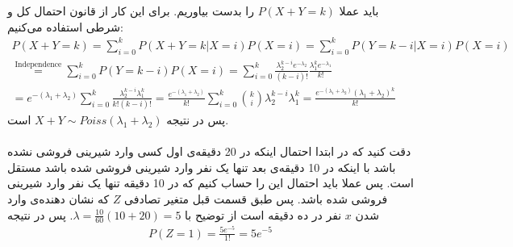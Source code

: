 \\
\\
باید عملا
$P(X + Y = k)$
را بدست بیاوریم. برای این کار از قانون احتمال کل و شرطی استفاده می‌کنیم:
\begin{gather*}
    P(X + Y = k) = \sum_{i=0}^k P(X + Y = k | X = i) P(X = i) = \sum_{i=0}^k P(Y = k - i | X = i) P(X = i)\\
    \stackrel{\text{Independence}}{=} \sum_{i=0}^k P(Y = k - i) P(X = i) = \sum_{i=0}^k \frac{\lambda_2^{k-i} e^{-\lambda_2}}{(k-i)!} \frac{\lambda_1^k e^{-\lambda_1}}{k!} \\
    = e^{-(\lambda_1 + \lambda_2)} \sum_{i=0}^k \frac{\lambda_2^{k-i} \lambda_1^k}{k!(k-i)!} = \frac{e^{-(\lambda_1 + \lambda_2)}}{k!} \sum_{i=0}^k {k \choose i} \lambda_2^{k-i} \lambda_1^k
    = \frac{e^{-(\lambda_1 + \lambda_2)} (\lambda_1 + \lambda_2)^k}{k!}
\end{gather*}
پس در نتیجه
$X + Y \sim Poiss(\lambda_1 + \lambda_2)$
است.
\\\\
دقت کنید که در ابتدا احتمال اینکه در 20 دقیقه‌ی اول کسی وارد شیرینی فروشی نشده باشد با اینکه در 10 دقیقه‌ی
بعد تنها یک نفر وارد شیرینی فروشی شده باشد مستقل است. پس عملا باید احتمال این را حساب کنیم که در 10 دقیقه
تنها یک نفر وارد شیرینی فروشی شده باشد. پس طبق قسمت قبل متغیر تصادفی
$Z$
که نشان دهنده‌ی وارد شدن
$x$
نفر در ده دقیقه است از توضیح
با
$\lambda = \frac{10}{60} (10 + 20) = 5$.
پس در نتیجه
\begin{gather*}
    P(Z = 1) = \frac{5 e^{-5}}{1!} = 5 e^{-5}
\end{gather*}